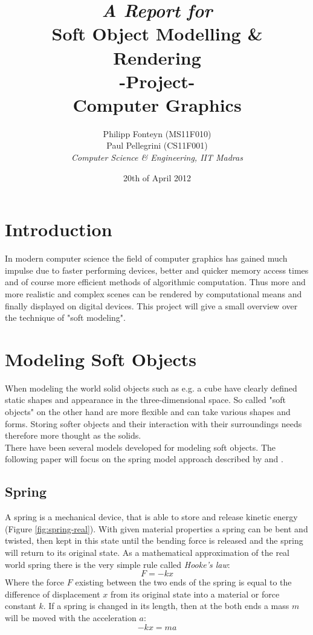 \documentclass[11pt]{article}
\title{
	\emph{A Report for}\\
	\huge{\textbf{Soft Object Modelling \& Rendering} }\\
	-Project-\\
	Computer Graphics\\[2em]	
}
\author{
	Philipp Fonteyn (MS11F010)\\
	Paul Pellegrini (CS11F001)\\[2em]
	\emph{Computer Science \& Engineering, IIT Madras}
}
\date{20th of April 2012}
\begin{document}
\maketitle
\newpage
\tableofcontents
\newpage

%
%
%
\section{Introduction}
In modern computer science the field of computer graphics has gained much impulse due to faster performing devices, better and quicker memory access times and of course more efficient methods of algorithmic computation. Thus more and more realistic and complex scenes can be rendered by computational means and finally displayed on digital devices. This project will give a small overview over the technique of "soft modeling".
%
%
%
\section{Modeling Soft Objects}
When modeling the world solid objects such as e.g. a cube have clearly defined static shapes and appearance in the three-dimensional space. So called "soft objects" on the other hand are more flexible and can take various shapes and forms. Storing softer objects and their interaction with their surroundings needs therefore more thought as the solids.\\[1em]
%
There have been several models developed for modeling soft objects. The following paper will focus on the spring model approach described by \cite{LSCS} and \cite{hair}\cite{gama}.\\[1em]
%
\subsection{Spring}
A spring is a mechanical device, that is able to store and release kinetic energy (Figure \ref{fig:spring-real}). With given material properties a spring can be bent and twisted, then kept in this state until the bending force is released and the spring will return to its original state. As a mathematical approximation of the real world spring there is the very simple rule called \textit{Hooke's law}:
$$F=-kx$$
Where the force $F$ existing between the two ends of the spring is equal to the difference of displacement $x$ from its original state into a material or force constant $k$. If a spring is changed in its length, then at the both ends a mass $m$ will be moved with the acceleration $a$:
$$-kx = ma$$
\end{document}
